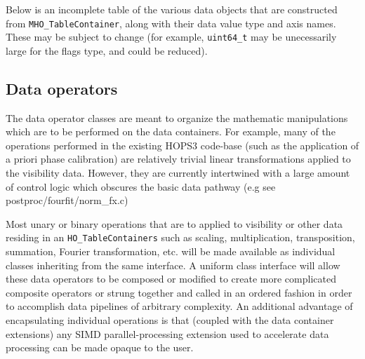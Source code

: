 Below is an incomplete table of the various data objects that are constructed from \texttt{MHO\_TableContainer}, along with their data value type and axis names. These may be subject to change (for example, \texttt{uint64\_t} may be unecessarily large for the flags type, and could be reduced).
\begin{center}
\end{center}

\subsection{Data operators}

The data operator classes are meant to organize the mathematic manipulations which are to be performed on the data containers. For example, many of the operations performed in the existing HOPS3 code-base (such as the application of a priori phase calibration) are relatively trivial linear transformations applied to the visibility data. However, they are currently intertwined with a large amount of control logic which obscures the basic data pathway (e.g see postproc/fourfit/norm\_fx.c)

Most unary or binary operations that are to applied to visibility or other data residing in an \texttt{HO\_TableContainers} such as scaling, multiplication, transposition, summation, Fourier transformation, etc. will be made available as individual classes inheriting from the same interface. A uniform class interface will allow these data operators to be composed or modified to create more complicated composite operators or strung together and called in an ordered fashion in order to accomplish data pipelines of arbitrary complexity. An additional advantage of encapsulating individual operations is that (coupled with the data container extensions) any SIMD parallel-processing extension used to accelerate data processing can be made opaque to the user.

